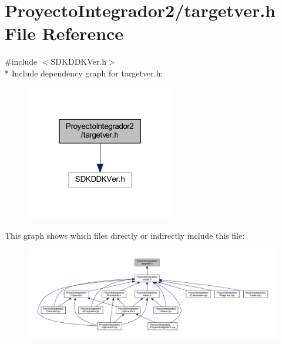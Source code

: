 \section{Proyecto\-Integrador2/targetver.h File Reference}
\label{targetver_8h}
{\ttfamily \#include $<$S\-D\-K\-D\-D\-K\-Ver.\-h$>$}\\*
Include dependency graph for targetver.\-h\-:\nopagebreak
\begin{figure}[H]
\begin{center}
\leavevmode
\includegraphics[width=184pt]{targetver_8h__incl}
\end{center}
\end{figure}
This graph shows which files directly or indirectly include this file\-:\nopagebreak
\begin{figure}[H]
\begin{center}
\leavevmode
\includegraphics[width=350pt]{targetver_8h__dep__incl}
\end{center}
\end{figure}
